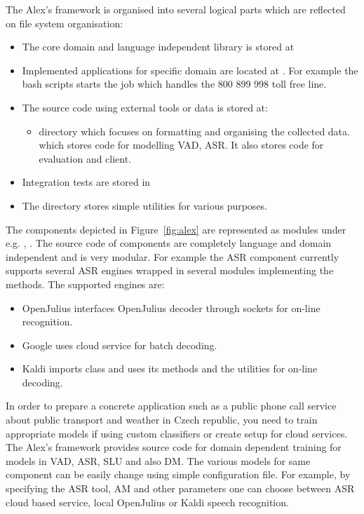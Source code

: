 The Alex's framework is organised into several logical parts which are reflected on file system organisation:
\begin{itemize}
    \item The core domain and language independent library is stored at 
    \item Implemented applications for specific domain are located at .
        For example the bash scripts  starts the job which handles the 800 899 998 toll free line.
    \item The source code using external tools or data is stored at:
        \begin{itemize}
            \item {} directory which focuses on formatting and organising the collected data.
            \term {} which stores code for modelling \ac{VAD}, \ac{ASR}. It also stores code for evaluation and  client.
        \end{itemize}
    \item Integration tests are stored in 
    \item The  directory stores simple utilities for various purposes.
\end{itemize}

The components depicted in Figure~\ref{fig:alex} are represented as 
modules under  e.g. ,  .
The source code of components are completely language and domain independent and is very modular.
For example the \ac{ASR} component currently supports several \ac{ASR} engines wrapped in several modules
implementing the  methods. 
The supported engines are:
\begin{itemize}
    \item OpenJulius  interfaces OpenJulius decoder through sockets for on-line recognition.
    \item Google  uses cloud service for batch decoding.
    \item Kaldi  imports  class and uses its methods and the utilities for on-line decoding.
\end{itemize}

In order to prepare a concrete application such as a public phone call service about public transport and weather in Czech republic, you need to train appropriate models if using custom classifiers or create setup for cloud services.
The Alex's framework provides source code for domain dependent training for models in \ac{VAD}, \ac{ASR}, \ac{SLU} and also \ac{DM}.
The various models for same component can be easily change using simple configuration file. 
For example, by specifying the \ac{ASR} tool, \ac{AM} and other parameters one can choose between \ac{ASR} cloud based service, local OpenJulius or Kaldi speech recognition.



